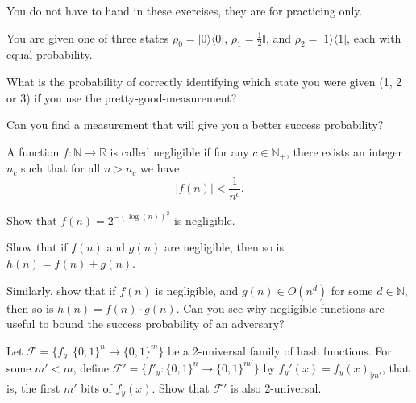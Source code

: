 \documentclass[a4paper,10pt,landscape,twocolumn]{scrartcl}
\newcommand{\ket}[1]{\lvert #1 \rangle}
\newcommand{\bra}[1]{\langle #1 \rvert}
\newcommand{\id}{\mathbb{I}}
\begin{document}
\practiceproblems

{\sffamily\noindent
You do not have to hand in these exercises, they are for practicing only. %
}

\begin{exercise}
You are given one of three states $\rho_0 = \ket0\bra0$, $\rho_1 = \frac{1}{2}\id$, and $\rho_2 = \ket1\bra1$, each with equal probability.
\begin{subex}
	What is the probability of correctly identifying which state you were given (1, 2 or 3) if you use the pretty-good-measurement?
\end{subex}
\begin{subex}
	Can you find a measurement that will give you a better success probability?
\end{subex}
\end{exercise}

\begin{exercise}
	A function $f: \mathbb{N} \to \mathbb{R}$ is called negligible if for any $c \in \mathbb{N}_+$, there exists an integer $n_c$ such that for all $n > n_c$ we have
	\[
	|f(n)| < \frac{1}{n^c}.
	\]
	\begin{subex}
		Show that $f(n) = 2^{-(\log(n))^2}$ is negligible.
	\end{subex}
	\begin{subex}
		Show that if $f(n)$ and $g(n)$ are negligible, then so is $h(n) = f(n) + g(n)$.
	\end{subex}
	\begin{subex}
		Similarly, show that if $f(n)$ is negligible, and $g(n) \in O(n^d)$ for some $d \in \mathbb{N}$, then so is $h(n) = f(n) \cdot g(n)$. Can you see why negligible functions are useful to bound the success probability of an adversary?
	\end{subex}
	
\end{exercise}

\begin{exercise}[2-universality]
Let $\mathscr{F} = \{f_y : \{0,1\}^n \to \{0,1\}^m\}$ be a 2-universal family of hash functions. For some $m' < m$, define $\mathscr{F}' = \{f'_y : \{0,1\}^n \to \{0,1\}^{m'}\}$ by $f_y'(x) = f_y(x)_{|m'}$, that is, the first $m'$ bits of $f_y(x)$. Show that $\mathscr{F}'$ is also 2-universal.
\end{exercise}
\end{document}
